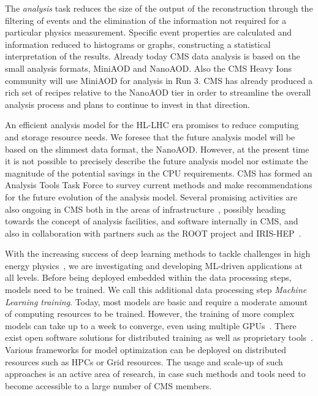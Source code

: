 \documentclass{cmspaper}
\begin{document}
The {\it analysis} task reduces the size of the output of the reconstruction through the filtering of events and the elimination of the information not required for a particular physics measurement. Specific event properties are calculated and information reduced to histograms or graphs, constructing a statistical interpretation of the results. Already today CMS data analysis is based on the small analysis formats, MiniAOD and NanoAOD. Also the CMS Heavy Ions community will use MiniAOD for analysis in Run 3. CMS has already produced a rich set of recipes relative to the NanoAOD tier in order to streamline the overall analysis process and plans to continue to invest in that direction.

An efficient analysis model for the HL-LHC era promises to reduce computing and storage resource needs. We foresee that the future analysis model will be based on the slimmest data format, the NanoAOD. However, at the present time it is not possible to precisely describe the future analysis model nor estimate the magnitude of the potential savings in the CPU requirements. CMS has formed an Analysis Tools Task Force to survey current methods and make recommendations for the future evolution of the analysis model. Several promising activities are also ongoing in CMS both in the areas of infrastructure~\cite{adamec2021coffeacasa}, possibly heading towards the concept of analysis facilities, and software internally in CMS, and also in collaboration with partners such as the ROOT project and IRIS-HEP~\cite{iris}.

With the increasing success of deep learning methods to tackle challenges in high energy physics~\cite{hepmllivingreview}, we are investigating and developing ML-driven applications at all levels. Before being deployed embedded within the data processing steps, models need to be trained. We call  this additional data processing step \textit{Machine Learning training}. Today, most models are basic and require a moderate amount of computing resources to be trained. However, the training of more complex models can take up to a week to converge, even using multiple GPUs~\cite{Pata:2750781}. There exist open software solutions for distributed training as well as proprietary tools~\cite{vlimant2021distributed}. Various frameworks for model optimization can be deployed on distributed resources such as HPCs or Grid resources. The usage and scale-up of such approaches is an active area of research, in case such methods and tools need to become accessible to a large number of CMS members.
\end{document}
